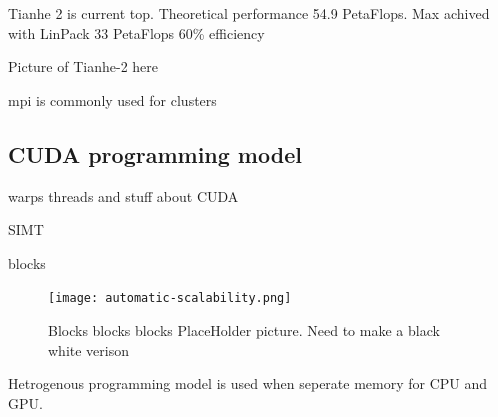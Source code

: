 \documentclass[10pt,a4paper]{article}
\begin{document}
Tianhe 2 is current top. Theoretical performance 54.9 PetaFlops.\cite{TOP500}
Max achived with LinPack 33 PetaFlops
60\% efficiency

Picture of Tianhe-2 here

mpi is commonly used for clusters\cite{kirk2012programming}

\subsection{CUDA programming model}
warps threads and stuff about CUDA\cite{cuda}

SIMT

blocks

\begin{figure}[h]
    \centering
    \texttt{[image: automatic-scalability.png]}
    \caption{Blocks blocks blocks PlaceHolder picture. Need to make a black white verison}
    \label{fig:blocks_scaling}
\end{figure}

Hetrogenous programming model is used when seperate memory for CPU and GPU.
\end{document}
